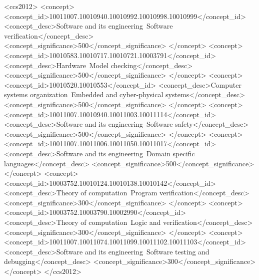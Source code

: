 \begin{CCSXML}
<ccs2012>
   <concept>
       <concept_id>10011007.10010940.10010992.10010998.10010999</concept_id>
       <concept_desc>Software and its engineering~Software verification</concept_desc>
       <concept_significance>500</concept_significance>
       </concept>
   <concept>
       <concept_id>10010583.10010717.10010721.10003791</concept_id>
       <concept_desc>Hardware~Model checking</concept_desc>
       <concept_significance>500</concept_significance>
       </concept>
   <concept>
       <concept_id>10010520.10010553</concept_id>
       <concept_desc>Computer systems organization~Embedded and cyber-physical systems</concept_desc>
       <concept_significance>500</concept_significance>
       </concept>
   <concept>
       <concept_id>10011007.10010940.10011003.10011114</concept_id>
       <concept_desc>Software and its engineering~Software safety</concept_desc>
       <concept_significance>500</concept_significance>
       </concept>
   <concept>
       <concept_id>10011007.10011006.10011050.10011017</concept_id>
       <concept_desc>Software and its engineering~Domain specific languages</concept_desc>
       <concept_significance>500</concept_significance>
       </concept>
   <concept>
       <concept_id>10003752.10010124.10010138.10010142</concept_id>
       <concept_desc>Theory of computation~Program verification</concept_desc>
       <concept_significance>300</concept_significance>
       </concept>
   <concept>
       <concept_id>10003752.10003790.10002990</concept_id>
       <concept_desc>Theory of computation~Logic and verification</concept_desc>
       <concept_significance>300</concept_significance>
       </concept>
   <concept>
       <concept_id>10011007.10011074.10011099.10011102.10011103</concept_id>
       <concept_desc>Software and its engineering~Software testing and debugging</concept_desc>
       <concept_significance>300</concept_significance>
       </concept>
 </ccs2012>
\end{CCSXML}


